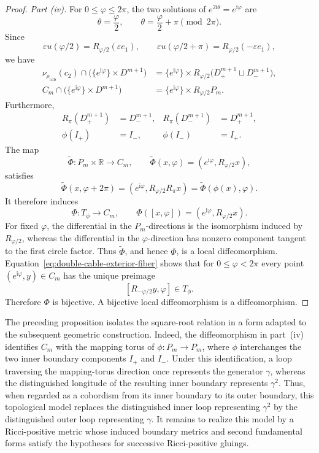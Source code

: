 \documentclass[11pt,reqno]{amsart}
\theoremstyle{definition}
\numberwithin{equation}{section}
\newcommand{\rhoCab}{{\rho_{\mathrm{cab}}}}
\begin{document}
\begin{proof}
\emph{Part \textup{(iv)}.}
For $0\le\varphi\le2\pi$, the two solutions of
$e^{2\mathrm i\theta}=e^{\mathrm i\varphi}$ are
\[
 \theta=\frac\varphi2,
 \qquad
 \theta=\frac\varphi2+\pi
 \pmod{2\pi}.
\]
Since
\[
 \varepsilon u(\varphi/2)=R_{\varphi/2}(\varepsilon e_1),
 \qquad
 \varepsilon u(\varphi/2+\pi)=R_{\varphi/2}(-\varepsilon e_1),
\]
we have
\begin{align}
 \nu_{\rhoCab}(c_2)\cap
 \bigl(\{e^{\mathrm i\varphi}\}\times D^{m+1}\bigr)
 &=\{e^{\mathrm i\varphi}\}\times
 R_{\varphi/2}\bigl(D^{m+1}_+\sqcup D^{m+1}_-\bigr),
                                                   \label{eq:double-cable-tube-fiber}\\
 C_m\cap\bigl(\{e^{\mathrm i\varphi}\}\times D^{m+1}\bigr)
 &=\{e^{\mathrm i\varphi}\}\times R_{\varphi/2}P_m.
                                                   \label{eq:double-cable-exterior-fiber}
\end{align}
Furthermore,
\begin{align*}
 R_\pi(D^{m+1}_+)&=D^{m+1}_-,
 &R_\pi(D^{m+1}_-)&=D^{m+1}_+,\\
 \phi(I_+)&=I_-,
 &\phi(I_-)&=I_+.
\end{align*}
The map
\[
 \widetilde\Phi:P_m\times\mathbb R\longrightarrow C_m,
 \qquad
 \widetilde\Phi(x,\varphi)
   =(e^{\mathrm i\varphi},R_{\varphi/2}x),
\]
satisfies
\[
 \widetilde\Phi(x,\varphi+2\pi)
 =(e^{\mathrm i\varphi},R_{\varphi/2}R_\pi x)
 =\widetilde\Phi(\phi(x),\varphi).
\]
It therefore induces
\[
 \Phi:T_\phi\longrightarrow C_m,
 \qquad
 \Phi([x,\varphi])
   =(e^{\mathrm i\varphi},R_{\varphi/2}x).
\]
For fixed $\varphi$, the differential in the $P_m$-directions is the
isomorphism induced by $R_{\varphi/2}$, whereas the differential in the
$\varphi$-direction has nonzero component tangent to the first circle
factor.  Thus $\widetilde\Phi$, and hence $\Phi$, is a local
diffeomorphism.  Equation~\eqref{eq:double-cable-exterior-fiber} shows
that for $0\le\varphi<2\pi$ every point
$(e^{\mathrm i\varphi},y)\in C_m$ has the unique preimage
\[
 [R_{-\varphi/2}y,\varphi]\in T_\phi.
\]
Therefore $\Phi$ is bijective.  A bijective local diffeomorphism is a
diffeomorphism.
\end{proof}

The preceding proposition isolates the square-root relation in a form
adapted to the subsequent geometric construction.  Indeed, the
diffeomorphism in part~(iv) identifies \(C_m\) with the mapping torus of
\(\phi\colon P_m\to P_m\), where \(\phi\) interchanges the two inner
boundary components \(I_+\) and \(I_-\).  Under this identification, a
loop traversing the mapping-torus direction once represents the
generator \(\gamma\), whereas the distinguished longitude of the resulting
inner boundary represents \(\gamma^2\).  Thus, when regarded as a cobordism
from its inner boundary to its outer boundary, this topological model
replaces the distinguished inner loop representing \(\gamma^2\) by the
distinguished outer loop representing \(\gamma\).  It remains to realize this
model by a Ricci-positive metric whose induced boundary metrics and
second fundamental forms satisfy the hypotheses for successive
Ricci-positive gluings.
\end{document}
